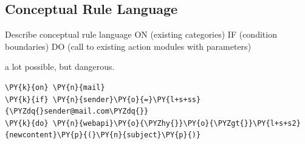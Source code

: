 \subsection{Conceptual Rule Language}
Describe conceptual rule language
ON (existing categories)
IF (condition boundaries)
DO (call to existing action modules with parameters)

a lot possible, but dangerous.

\begin{Verbatim}[fontsize=\small,commandchars=\\\{\}]
\PY{k}{on} \PY{n}{mail}
\PY{k}{if} \PY{n}{sender}\PY{o}{=}\PY{l+s+ss}{\PYZdq{}sender@mail.com\PYZdq{}}
\PY{k}{do} \PY{n}{webapi}\PY{o}{\PYZhy{}}\PY{o}{\PYZgt{}}\PY{l+s+s2}{newcontent}\PY{p}{(}\PY{n}{subject}\PY{p}{)}
\end{Verbatim}
